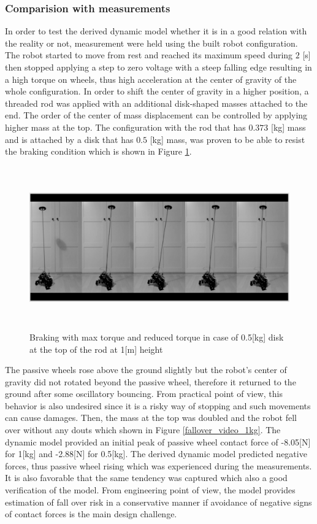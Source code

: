 \documentclass[12pt,english]{article}
\begin{document}
\subsubsection{Comparision with measurements}
In order to test the derived dynamic model whether it is in a good relation with the reality or not, measurement were held using the built robot configuration. The robot started to move from rest and reached its maximum speed during $2$ [s] then stopped applying a step to zero voltage with a steep falling edge resulting in a high torque on wheels, thus high acceleration at the center of gravity of the whole configuration. In order to shift the center of gravity in a higher position, a threaded rod was applied with an additional disk-shaped masses attached to the end. The order of the center of mass displacement can be controlled by applying higher mass at the top. The configuration with the rod that has $0.373$ [kg] mass and is attached by a disk that has $0.5$ [kg] mass, was proven to be able to resist the braking condition which is shown in Figure \ref{fallover_video_05kg}.
\begin{figure}[htb!]
	\centering
	\includegraphics[height=7cm]{figures/fallover_video_05kg.png}
	\caption{Braking with max torque and reduced torque in case of 0.5[kg] disk at the top of the rod at 1[m] height}
	\label{fallover_video_05kg}
\end{figure}
 The passive wheels rose above the ground slightly but the robot's center of gravity did not rotated beyond the passive wheel, therefore it returned to the ground after some oscillatory bouncing. From practical point of view, this behavior is also undesired since it is a risky way of stopping and such movements can cause damages. Then, the mass at the top was doubled and the robot fell over without any douts which shown in Figure \ref{fallover_video_1kg}. The dynamic model provided an initial peak of passive wheel contact force of -8.05[N] for 1[kg] and -2.88[N] for 0.5[kg]. The derived dynamic model predicted negative forces, thus passive wheel rising which was experienced during the measurements. It is also favorable that the same tendency was captured which also a good verification of the model. From engineering point of view, the model provides estimation of fall over risk in a conservative manner if avoidance of negative signs of contact forces is the main design challenge.
\end{document}
